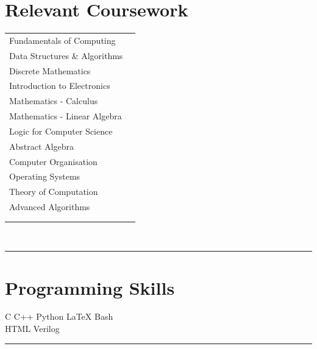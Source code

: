 \documentclass[letterpaper]{Formatting}
\begin{document}
\begin{minipage}[t]{0.3\textwidth}
\section{Relevant Coursework}
\begin{tabular}{lp{1cm}}
Fundamentals of Computing \\
Data Structures \& Algorithms \\
Discrete Mathematics \\
Introduction to Electronics \\
Mathematics - Calculus \\
Mathematics - Linear Algebra \\
Logic for Computer Science \\
Abstract Algebra \\
Computer Organisation \\
Operating Systems \\
Theory of Computation \\
Advanced Algorithms \\
\multicolumn{2}{c}{} \\ \\
\end{tabular}
\\
\sectionspace %
\vspace{-4.5ex}
\rule{5cm}{0.5pt}
\vspace{2ex}


\section{Programming Skills}


C \textbullet{} C++ \textbullet{} Python \textbullet{} \LaTeX \textbullet{} Bash \\
HTML \textbullet{} Verilog \\
\sectionspace %
\vspace{-1.5ex}
\rule{5cm}{0.5pt}
\vspace{2ex}



\end{minipage}
\end{document}
